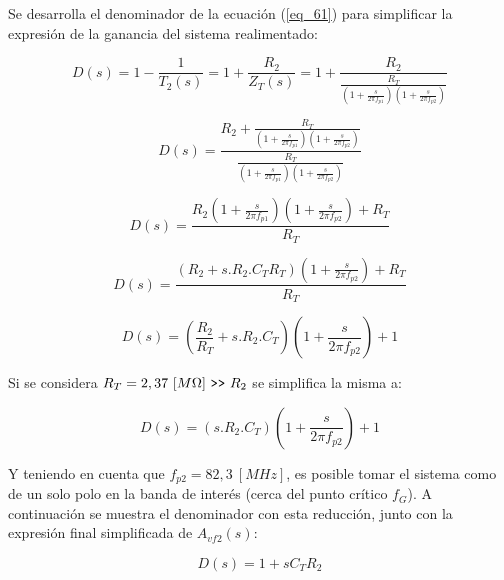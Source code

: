 \documentclass[12pt,a4paper]{article}
\begin{document}
Se desarrolla el denominador de la ecuación (\ref{eq_61}) para simplificar la expresión de la ganancia del sistema realimentado:

       \begin{equation}
        \label{eq_64}
D(s) = 1-\frac{1}{T_2(s)} = 1+\frac{R_2}{Z_T(s)} = 1+\frac{R_2}{\frac{R_T}{\left(1+\frac{s}{2\pi f_{p1}}\right)\left(1+\frac{s}{2\pi f_{p2}}\right)}}
\end{equation}

       \begin{equation}
        \label{eq_65}
D(s) = \frac{R_2+\frac{R_T}{\left(1+\frac{s}{2\pi f_{p1}}\right)\left(1+\frac{s}{2\pi f_{p2}}\right)}}{\frac{R_T}{\left(1+\frac{s}{2\pi f_{p1}}\right)\left(1+\frac{s}{2\pi f_{p2}}\right)}}
\end{equation}

       \begin{equation}
        \label{eq_66}
D(s) = \frac{R_2\left(1+\frac{s}{2\pi f_{p1}}\right)\left(1+\frac{s}{2\pi f_{p2}}\right)+R_T}{R_T}
\end{equation}

       \begin{equation}
        \label{eq_67}
D(s) = \frac{\left(R_2+s.R_2.C_TR_T\right)\left(1+\frac{s}{2\pi f_{p2}}\right)+R_T}{R_T}
\end{equation}

       \begin{equation}
        \label{eq_68}
D(s) = \left(\frac{R_2}{R_T}+s.R_2.C_T\right)\left(1+\frac{s}{2\pi f_{p2}}\right)+1
\end{equation}
\hspace{0.5 cm}

Si se considera $R_T = 2,37~[M\Omega]~\verb|>>|~R_2$ se simplifica la misma a:

\begin{equation}
\label{eq_69}
D(s) = \left(s.R_2.C_T\right)\left(1+\frac{s}{2\pi f_{p2}}\right)+1
\end{equation}
\hspace{0.5 cm}

Y teniendo en cuenta que $f_{p2} = 82,3~[MHz]$, es posible tomar el sistema como de un solo polo en la banda de interés (cerca del punto crítico $f_G$). A continuación se muestra el denominador con esta reducción, junto con la expresión final simplificada de $A_{vf2}(s)$:

\begin{equation}
        \label{eq_70}
D(s) = 1 + sC_TR_2
\end{equation}
\end{document}
